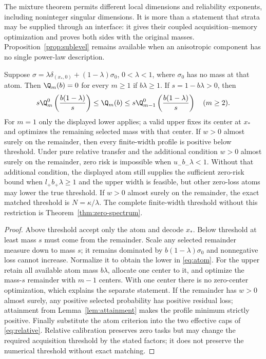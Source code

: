 The mixture theorem permits different local dimensions and reliability exponents, including noninteger singular dimensions. It is more than a statement that strata may be supplied through an interface: it gives their coupled acquisition--memory optimization and proves both sides with the original masses. Proposition~\ref{prop:sublevel} remains available when an anisotropic component has no single power-law description.

\begin{proposition}\label{prop:atom}
Suppose $\sigma=\lambda\delta_{(x_*,0)}+(1-\lambda)\sigma_0$, $0<\lambda<1$, where $\sigma_0$ has no mass at that atom. Then $\Q_m(b)=0$ for every $m\ge1$ if $b\lambda\ge1$. If $s=1-b\lambda>0$, then
\begin{equation}\label{eq:atom}
 s\Q_m^0\left(\frac{b(1-\lambda)}s\right)
 \le\Q_m(b)\le
 s\Q_{m-1}^0\left(\frac{b(1-\lambda)}s\right)\quad(m\ge2).
\end{equation}
For $m=1$ only the displayed lower applies; a valid upper fixes its center at $x_*$ and optimizes the remaining selected mass with that center. If $w>0$ almost surely on the remainder, then every finite-width profile is positive below threshold. Under pure relative transfer and the additional condition $w>0$ almost surely on the remainder, zero risk is impossible when $u_-b_-\lambda<1$. Without that additional condition, the displayed atom still supplies the sufficient zero-risk bound when $l_+b_+\lambda\ge1$ and the upper width is feasible, but other zero-loss atoms may lower the true threshold. If $w>0$ almost surely on the remainder, the exact matched threshold is $N=\kappa/\lambda$. The complete finite-width threshold without this restriction is Theorem~\ref{thm:zero-spectrum}.
\end{proposition}
\begin{proof}
Above threshold accept only the atom and decode $x_*$. Below threshold at least mass $s$ must come from the remainder. Scale any selected remainder measure down to mass $s$; it remains dominated by $b(1-\lambda)\sigma_0$ and nonnegative loss cannot increase. Normalize it to obtain the lower in \eqref{eq:atom}. For the upper retain all available atom mass $b\lambda$, allocate one center to it, and optimize the mass-$s$ remainder with $m-1$ centers. With one center there is no zero-center optimization, which explains the separate statement. If the remainder has $w>0$ almost surely, any positive selected probability has positive residual loss; attainment from Lemma~\ref{lem:attainment} makes the profile minimum strictly positive. Finally substitute the atom criterion into the two effective caps of \eqref{eq:relative}. Relative calibration preserves zero tasks but may change the required acquisition threshold by the stated factors; it does not preserve the numerical threshold without exact matching.
\end{proof}

